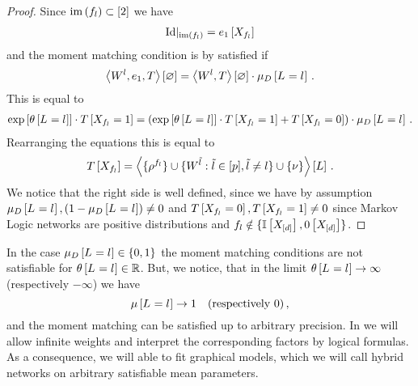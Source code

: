 \begin{proof}
	Since $\mathrm{im}\left(f_{l}\right)\subset[2]$ we have
	\begin{align*}
		{\mathrm{Id}}|_{\mathrm{im}\left(f_{l}\right)} = e_{1}\left[X_{f_{l}}\right]
	\end{align*}
	and the moment matching condition is by  satisfied if
	\begin{align*}
		\left\langle W^{l}, e_{1}, T\right\rangle \left[ \varnothing \right]
			= \left\langle W^{l},T\right\rangle \left[ \varnothing \right] \cdot \mu_{D}\left[L_{}=l_{}\right] \, . 
	\end{align*}
	This is equal to 
	\begin{align*}
		\mathrm{exp}\left[\theta\left[L_{}=l_{}\right]\right] \cdot T\left[X_{f_{l}}=1\right]
		= \left( \mathrm{exp}\left[\theta\left[L_{}=l_{}\right]\right] \cdot T\left[X_{f_{l}}=1\right] + T\left[X_{f_{l}}=0\right] \right) \cdot \mu_{D}\left[L_{}=l_{}\right] \, . 
	\end{align*}
	Rearranging the equations this is equal to 
	\begin{align*}
	 	T\left[X_{f_{l}}\right] 
		= \left\langle \{\rho^{f_{l}}\}
		\cup\{W^{\tilde{l}} : \tilde{l} \in [p], \tilde{l}\neq l\}
		\cup\{\nu\}\right\rangle \left[ L \right] \, . 
	\end{align*}
	We notice that the right side is well defined, since we have by assumption $\mu_{D}\left[L_{}=l_{}\right], (1- \mu_{D}\left[L_{}=l_{}\right]) \neq 0$ and $T\left[X_{f_{l}}=0\right], T\left[X_{f_{l}}=1\right] \neq 0$ since Markov Logic networks are positive distributions and $f_{l} \notin \{\mathbb{I}\left[X_{[d]}\right],0\left[X_{[d]}\right]\}$.
\end{proof}


In the case $\mu_{D}\left[L_{}=l_{}\right]\in\{0,1\}$ the moment matching conditions are not satisfiable for $\theta\left[L_{}=l_{}\right]\in\mathbb{R}$.
But, we notice, that in the limit $\theta\left[L_{}=l_{}\right]\rightarrow \infty $ (respectively $-\infty$) we have
	\[ \mu\left[L_{}=l_{}\right] \rightarrow  1 \quad \text{(respectively $0$)}\, ,  \]
and the moment matching can be satisfied up to arbitrary precision.
In  we will allow infinite weights and interpret the corresponding factors by logical formulas.
As a consequence, we will able to fit graphical models, which we will call hybrid networks on arbitrary satisfiable mean parameters.

